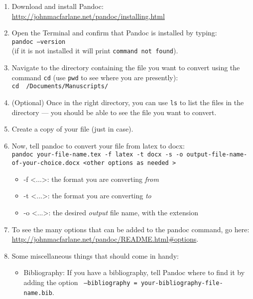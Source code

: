 \documentclass{article}
\newcommand{\tl} {\textless}
\newcommand{\tg} {\textgreater}
\begin{document}
\begin{enumerate}
\item Download and install Pandoc: \url{http://johnmacfarlane.net/pandoc/installing.html}
\item Open the Terminal and confirm that
  Pandoc is installed by typing:\\
\texttt{pandoc {--}version}\\ (if it is not installed it will print \texttt{command not found}).
\item Navigate to the directory containing the file you want to
  convert using the command \texttt{cd} (use \texttt{pwd} to see where you are
  presently):\\
\texttt{cd ~/Documents/Manuscripts/}
\item (Optional) Once in the right directory, you can use \texttt{ls} to list
  the files in the directory --- you should be able to see the file
  you want to convert.
\item Create a copy of your file (just in case).
\item Now, tell pandoc to convert your file from latex to docx:\\
\texttt{pandoc your-file-name.tex -f latex -t docx -s -o
 output-file-name-of-your-choice.docx \tl other options as
needed \tg}
\begin{itemize}
\item -f \tl...\tg: the format you are converting \emph{from}
\item -t \tl...\tg: the format you are converting \emph{to}
\item -o \tl...\tg: the desired \emph{output} file name, with the
  extension
\end{itemize}
\item To see the many options that can be added to the pandoc command,
  go here: \url{http://johnmacfarlane.net/pandoc/README.html#options}.
\item Some miscellaneous things that should come in handy:

\begin{itemize}
\item Bibliography: If you have a bibliography, tell Pandoc where to find it by
  adding the option \texttt{ {--}bibliography = your-bibliography-file-name.bib}.


\end{itemize}
\end{enumerate}
\end{document}
